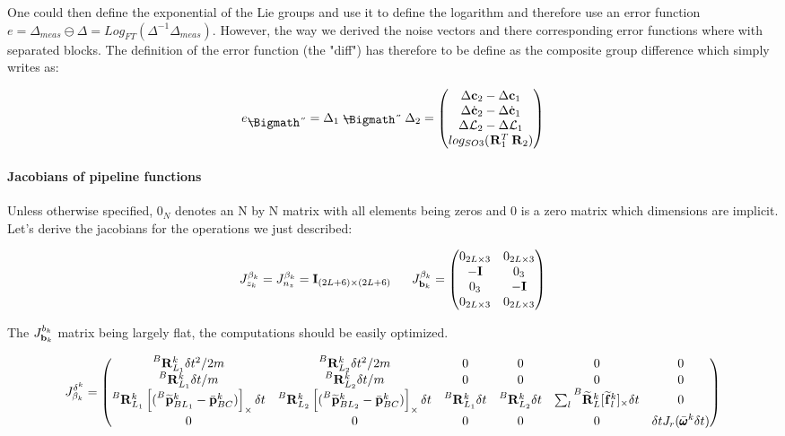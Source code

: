 \documentclass[11pt]{article}
\newcommand{\Rot}[2]{\prescript{#1}{}{\bfR}_{#2}}
\newcommand{\Rotm}[2]{\prescript{#1}{}{\widetilde{\bfR}}_{#2}}
\newcommand{\bias}{\bfb}
\newcommand{\posim}[2]{\prescript{#1}{}{\widetilde{\bfp}}_{#2}}
\newcommand{\posibar}{\bar{\bfp}}
\newcommand{\angvelbar}{\bar{\pmb{\omega}}}
\newcommand{\forcem}[2]{\prescript{#1}{}{\widetilde{\bff}}_{#2}}
\newcommand{\AM}{\mathcal{L}}
\newcommand{\COM}{\bfc}
\newcommand{\COMd}{\dot{\bfc}}
\newcommand{\Ident}{\bfI}
\def\diamondminus{\mathrel{%
		\ooalign{$-$\cr\hss\lower.255ex\hbox{\Bigmath\char5}\hss}}}
\begin{document}
One could then define the exponential of the Lie groups and use it to define the logarithm and therefore use an error function $e = \Delta_{meas} \ominus \Delta =  Log_{FT}(\Delta^{-1} \Delta_{meas})$. However, the way we derived the noise vectors and there corresponding error functions where with separated blocks. The definition of the error function (the "diff") has therefore to be define as the composite group difference which simply writes as:

\begin{equation}
	e_{\diamondminus} = \Delta_1 \diamondminus \Delta_2 =
	\begin{pmatrix}
	\Delta \COM_2 - \Delta \COM_1
	\\
	\Delta \COMd_2 - \Delta \COMd_1
	\\
	\Delta \AM_2 - \Delta \AM_1
	\\
	log_{SO3}(\Rot{}{1}^T \Rot{}{2})
	\end{pmatrix}
\end{equation}







\paragraph{Jacobians of pipeline functions}
Unless otherwise specified, $0_N$ denotes an N by N matrix with all elements being zeros and $0$ is a zero matrix which dimensions are implicit.
Let's derive the jacobians for the operations we just described:

\begin{equation}
    J^{\beta_k}_{z_k} = J^{\beta_k}_{n_z} = \Ident_{(2L+6)\times (2L+6)}
    ~~~~~
    J^{\beta_k}_{\bias_k} =
    \begin{pmatrix}
    0_{2L\times 3} & 0_{2L\times 3}
    \\
    -\Ident & 0_3
    \\
    0_3 & -\Ident
	\\
	0_{2L\times 3} & 0_{2L\times 3}
    \end{pmatrix}
\end{equation}

The $J^{b_k}_{\bias_k}$ matrix being largely flat, the computations should be easily optimized.

\begin{equation}
J^{\delta ^k}_{\beta_k} =
\begin{pmatrix}
    \Rot{B}{L_1}^k \delta t^2/2m & \Rot{B}{L_2}^k \delta t^2/2m & 0 & 0 & 0 & 0 
    \\
    \Rot{B}{L_1}^k \delta t/m & \Rot{B}{L_2}^k \delta t/m & 0 & 0 & 0 & 0  
    \\
    \Rot{B}{L_1}^k\left[(\posim{B}{BL_1}^k - \posibar_{BC}^k) \right]_{\times} \delta t & \Rot{B}{L_2}^k\left[(\posim{B}{BL_2}^k - \posibar_{BC}^k) \right]_{\times} \delta t & \Rot{B}{L_1}^k \delta t &  \Rot{B}{L_2}^k \delta t & \sum_{l} \Rotm{B}{L}^k [\forcem{}{l}^k]_{\times} \delta t & 0 
    \\
    0 & 0 & 0 & 0 & 0 & \delta t J_r (\angvelbar^k \delta t)
\end{pmatrix}
\end{equation}
\end{document}
